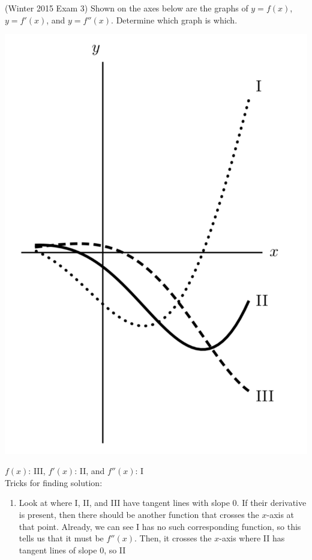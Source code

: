 \documentclass[11pt]{exam}
\begin{document}
\begin{questions}
\question (Winter 2015 Exam 3) 	Shown on the axes below are the graphs of $y = f(x)$, $y = f'(x)$, and $y = f''(x)$. Determine which graph is which.
  \begin{center}
    \includegraphics[scale=0.45]{Figures/match.png}
  \end{center}
  \begin{solution}
    \(f(x)\): III, \(f'(x)\): II, and \(f''(x)\): I\\
    Tricks for finding solution:
    \begin{enumerate}
    \item Look at where I, II, and III have tangent lines with slope
      \(0\). If their derivative is present, then there should be
      another function that crosses the \(x\)-axis at that
      point. Already, we can see I has no such corresponding function,
      so this tells us that it must be \(f''(x)\). Then, it crosses
      the \(x\)-axis where II has tangent lines of slope \(0\), so II

\end{enumerate}
\end{solution}
\end{questions}
\end{document}
